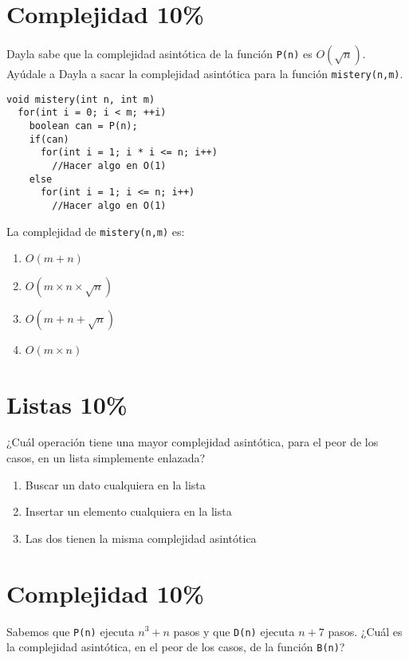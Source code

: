 \documentclass[twocolumn]{article}
\begin{document}

\section{Complejidad 10\%}
Dayla sabe que la complejidad asintótica de la función \texttt{P(n)} es $O (\sqrt{n})$. Ayúdale a Dayla a sacar la complejidad asintótica para la función \texttt{mistery(n,m)}.

{\small
\begin{verbatim}
void mistery(int n, int m) 
  for(int i = 0; i < m; ++i) 
    boolean can = P(n);
    if(can) 
      for(int i = 1; i * i <= n; i++) 
        //Hacer algo en O(1)
    else 
      for(int i = 1; i <= n; i++) 
        //Hacer algo en O(1)	
\end{verbatim}
}

\noindent
La complejidad de \texttt{mistery(n,m)} es:

\begin{enumerate}[label=\Alph*]
	\item $O (m + n)$
	\item $O (m \times n \times \sqrt{n})$
	\item $O (m + n + \sqrt{n})$
	\item $O (m \times n )$
\end{enumerate} 


\section{Listas 10\%}
¿Cuál operación tiene una mayor complejidad asintótica, para el peor de los casos, 
en un lista simplemente enlazada?

\begin{enumerate}[label=\Alph*]
	\item Buscar un dato cualquiera en la lista
	\item Insertar un elemento cualquiera en la lista
	\item Las dos tienen la misma complejidad asintótica
\end{enumerate}


\section{Complejidad 10\%}
Sabemos que \texttt{P(n)} ejecuta $n^3 + n$ pasos y que \texttt{D(n)} ejecuta $n + 7$ pasos. ¿Cuál es la complejidad asintótica, en el peor de los casos, de la función \texttt{B(n)}?
\end{document}
